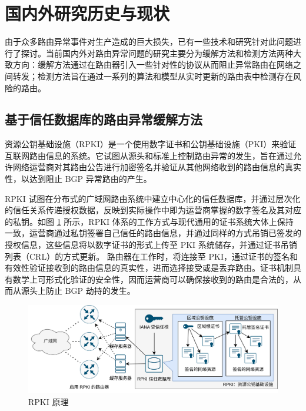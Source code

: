 \section{国内外研究历史与现状}


由于众多路由异常事件对生产造成的巨大损失，已有一些技术和研究针对此问题进行了探讨。当前国内外对路由异常问题的研究主要分为缓解方法和检测方法两种大致方向：缓解方法通过在路由器引入一些针对性的协议从而阻止异常路由在网络之间转发；检测方法旨在通过一系列的算法和模型从实时更新的路由表中检测存在风险的路由。

\subsection{基于信任数据库的路由异常缓解方法}

资源公钥基础设施（RPKI）是一个使用数字证书和公钥基础设施（PKI）来验证互联网路由信息的系统。它试图从源头和标准上控制路由异常的发生，旨在通过允许网络运营商对其路由公告进行加密签名并验证从其他网络收到的路由信息的真实性，以达到阻止 BGP 异常路由的产生。

RPKI 试图在分布式的广域网路由系统中建立中心化的信任数据库，并通过层次化的信任关系传递授权数据，反映到实际操作中即为运营商掌握的数字签名及其对应的私钥。如图 \ref{c1_rpki} 所示，RPKI 体系的工作方式与现代通用的证书系统大体上保持一致，运营商通过私钥签署自己信任的路由信息，并通过同样的方式吊销已签发的授权信息，这些信息将以数字证书的形式上传至 PKI 系统储存，并通过证书吊销列表（CRL）的方式更新。 路由器在工作时，将连接至 PKI，通过证书的签名和有效性验证接收到的路由信息的真实性，进而选择接受或是丢弃路由。证书机制具有数学上可形式化验证的安全性，因而运营商可以确保接收到的路由是合法的，从而从源头上防止 BGP 劫持的发生。

\begin{figure}[h]
    \includegraphics[width=0.9\linewidth]{chapter/c1_images/c1_rpki.png}
    \caption{RPKI 原理}
    \label{c1_rpki}
\end{figure}

